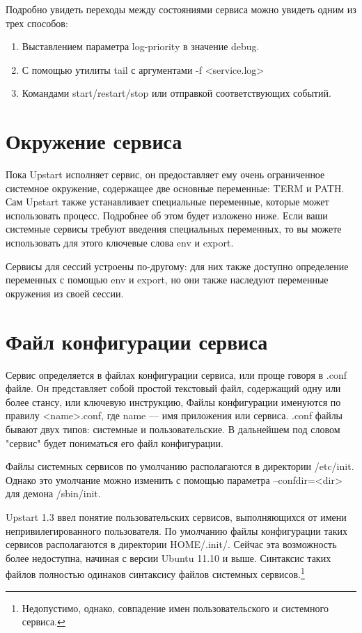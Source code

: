 Подробно увидеть переходы между состояниями сервиса можно увидеть одним из трех способов: \begin{enumerate}
\item Выставлением параметра log-priority в значение debug.
\item С помощью утилиты tail с аргументами -f <service.log>
\item Командами start/restart/stop или отправкой соответствующих событий.
\end{enumerate}
\section{Окружение сервиса}
Пока Upstart исполняет сервис, он предоставляет ему очень ограниченное системное окружение, 
содержащее две основные переменные: TERM и PATH. Сам Upstart также устанавливает специальные переменные, которые может использовать процесс. Подробнее об этом будет изложено ниже. Если ваши системные сервисы 
требуют введения специальных переменных, то вы можете использовать для этого ключевые слова env и export.

Сервисы для сессий устроены по-другому: для них также доступно определение переменных с помощью env и export, но они также наследуют переменные окружения из своей сессии.
\section{Файл конфигурации сервиса}
Сервис определяется в файлах конфигурации сервиса, или проще говоря в .conf файле. Он представляет собой простой текстовый файл, содержащий одну или более стансу, или ключевую инструкцию, Файлы конфигурации именуются по правилу <name>.conf, где  name --- имя приложения или сервиса. .conf файлы бывают двух типов: 
системные и пользовательские. В дальнейшем под словом "сервис" будет пониматься его файл конфигурации.

Файлы системных сервисов по умолчанию располагаются в директории /etc/init. Однако это умолчание можно изменить с помощью параметра --confdir=<dir> для демона /sbin/init. 

Upstart 1.3 ввел понятие пользовательских сервисов, выполняющихся от имени непривилегированного пользователя. По умолчанию файлы конфигурации таких сервисов располагаются в директории \textdollar HOME/.init/. Сейчас эта возможность более недоступна, начиная с версии Ubuntu 11.10 и выше.
Синтаксис таких файлов полностью одинаков синтаксису файлов системных сервисов.\footnote{Недопустимо, однако, совпадение имен пользовательского и системного сервиса.}

